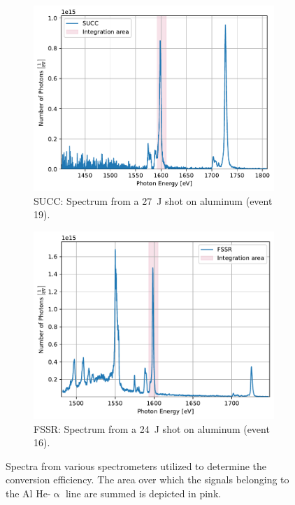 \begin{figure} [H]
\begin{subfigure}[t]{0.49\textwidth}
		\label{}
	\end{subfigure}
	\begin{subfigure}[t]{0.49\textwidth}
		\centering
		\includegraphics[width=\textwidth]{Data_Analysis/converison_efficiency/spectra_of_Al_event_19_on_SUCC.pdf}
		\caption{SUCC: Spectrum from a \SI{27}{\joule} shot on aluminum (event 19).}
		\label{}
	\end{subfigure}%
	\hfill
	\begin{subfigure}[t]{0.49\textwidth}
		\centering
		\includegraphics[width=\textwidth]{Data_Analysis/converison_efficiency/spectra_of_Al_(thick)_event_16_on_FSSR.pdf}
		\caption{FSSR: Spectrum from a \SI{24}{\joule} shot on aluminum (event 16).}
		\label{}
	\end{subfigure}%
	\caption{Spectra from various spectrometers utilized to determine the conversion efficiency. The area over which the signals belonging to the Al He-$\upalpha$ line are summed is depicted in pink.}
	\label{}
\end{figure}

